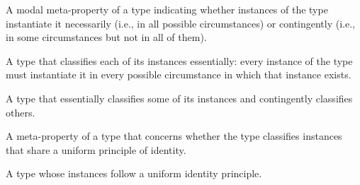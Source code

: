\begin{description}[style=nextline]
\item[Rigidity] A modal meta-property of a type indicating whether instances of the type instantiate it necessarily (i.e., in all possible circumstances) or contingently (i.e., in some circumstances but not in all of them).

\item[Rigid Type] A type that classifies each of its instances essentially: every instance of the type must instantiate it in every possible circumstance in which that instance exists.

\item[Semi-Rigid Type] A type that essentially classifies some of its instances and contingently classifies others. 

\item[Sortality] A meta-property of a type that concerns whether the type classifies instances that share a uniform principle of identity.

\item[Sortal Type] A type whose instances follow a uniform identity principle.




\end{description}